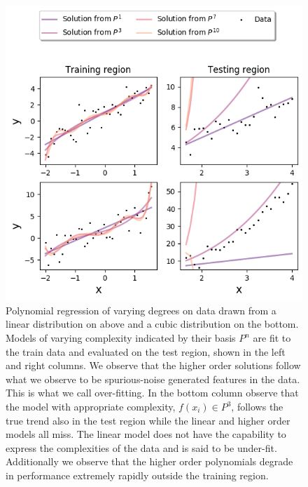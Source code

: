 \begin{figure}
\centering
\includegraphics[width=\textwidth]{../figures/y_distr.png}
\caption[Illustrating over-fitting with polynomial regression]{Polynomial regression of varying degrees on data drawn from a linear distribution on above and a cubic distribution on the bottom. Models of varying complexity indicated by their basis $P^n$ are fit to the train data and evaluated on the test region, shown in the left and right columns. We observe that the higher order solutions follow what we observe to be  spurious-noise generated features in the data. This is what we call over-fitting. In the bottom column observe that the model with appropriate complexity, $f(x_i) \in P^3$, follows the true trend also in the test region while the linear and higher order models all miss. The linear model does not have the capability to express the complexities of the data and is said to be under-fit. Additionally we observe that the higher order polynomials degrade in performance extremely rapidly outside the training region.}\label{fig:overfit}
\end{figure}

